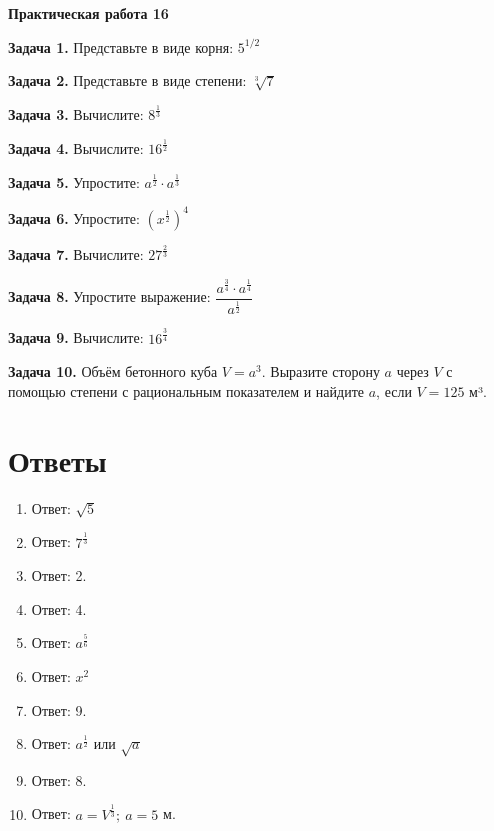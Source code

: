 \documentclass{umk-matematika}
\begin{document}
\begin{center}
{\Large\bfseries Практическая работа 16}
\end{center}
\vspace{0.5cm}

\textbf{Задача 1.} Представьте в виде корня: $5^{1/2}$\par\vspace{10pt}
\textbf{Задача 2.} Представьте в виде степени: $\sqrt[3]{7}$\par\vspace{10pt}
\textbf{Задача 3.} Вычислите: $8^{\frac{1}{3}}$\par\vspace{10pt}
\textbf{Задача 4.} Вычислите: $16^{\frac{1}{2}}$\par\vspace{10pt}
\textbf{Задача 5.} Упростите: $a^{\frac{1}{2}} \cdot a^{\frac{1}{3}}$\par\vspace{10pt}
\textbf{Задача 6.} Упростите: $\left(x^{\frac{1}{2}}\right)^4$\par\vspace{10pt}
\textbf{Задача 7.} Вычислите: $27^{\frac{2}{3}}$\par\vspace{10pt}
\textbf{Задача 8.} Упростите выражение: $\dfrac{a^{\frac{3}{4}} \cdot a^{\frac{1}{4}}}{a^{\frac{1}{2}}}$\par\vspace{10pt}
\textbf{Задача 9.} Вычислите: $16^{\frac{3}{4}}$\par\vspace{10pt}
\textbf{Задача 10.} Объём бетонного куба $V = a^3$. Выразите сторону $a$ через $V$ с помощью степени с рациональным показателем и найдите $a$, если $V = 125$ м³.\par\vspace{10pt}
\newpage
\section*{Ответы}

\begin{enumerate}
  \item Ответ: $\sqrt{5}$
  \item Ответ: $7^{\frac{1}{3}}$
  \item Ответ: 2.
  \item Ответ: 4.
  \item Ответ: $a^{\frac{5}{6}}$
  \item Ответ: $x^2$
  \item Ответ: 9.
  \item Ответ: $a^{\frac{1}{2}}$ или $\sqrt{a}$
  \item Ответ: 8.
  \item Ответ: $a = V^{\frac{1}{3}};\ a = 5$ м.
\end{enumerate}
\end{document}
